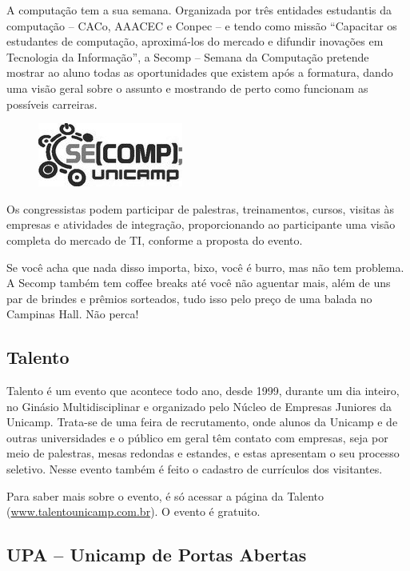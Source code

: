 A computação tem a sua semana. Organizada por três entidades estudantis da computação
-- CACo, AAACEC e Conpec -- e tendo como missão “Capacitar os estudantes de computação, aproximá-los do mercado e difundir inovações em 
Tecnologia da Informação”, a Secomp -- Semana da Computação pretende mostrar ao aluno 
todas as oportunidades que existem  após a formatura, dando uma visão geral sobre o 
assunto e mostrando de perto como funcionam as possíveis carreiras.
\begin{figure}[h!]
    \vspace{-10pt}
    \centering
    \includegraphics[scale=0.68, keepaspectratio=true]{img/imgs/secomp.jpg}
    \vspace{-10pt}
\end{figure}

Os  congressistas podem participar de palestras, treinamentos, cursos, visitas às
empresas e atividades de integração, proporcionando ao participante uma visão completa 
do mercado de TI, conforme a proposta do evento.

Se você acha que nada disso importa, bixo, você é burro, mas não tem problema. A Secomp também tem
coffee breaks até você não aguentar mais, além de uns par de brindes e prêmios
sorteados, tudo isso pelo preço de uma balada no Campinas Hall. Não perca!

\subsection{Talento}

Talento é um evento que acontece todo ano, desde 1999, durante um dia inteiro,
no Ginásio Multidisciplinar e organizado pelo Núcleo de Empresas Juniores da
Unicamp. Trata-se de uma feira de recrutamento, onde alunos da Unicamp e de
outras universidades e o público em geral têm contato com empresas, seja por
meio de palestras, mesas redondas e estandes, e estas apresentam o seu processo
seletivo. Nesse evento também é feito o cadastro de currículos dos visitantes.

Para saber mais sobre o evento, é só acessar a página da Talento
(\url{www.talentounicamp.com.br}). O evento é gratuito.

\subsection{UPA -- Unicamp de Portas Abertas}

